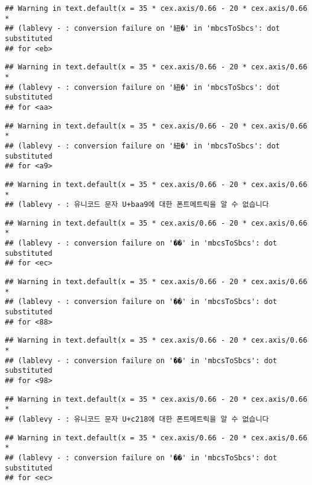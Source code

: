 \documentclass[]{article}
\begin{document}
\begin{verbatim}
## Warning in text.default(x = 35 * cex.axis/0.66 - 20 * cex.axis/0.66 *
## (lablevy - : conversion failure on '紐�' in 'mbcsToSbcs': dot substituted
## for <eb>
\end{verbatim}

\begin{verbatim}
## Warning in text.default(x = 35 * cex.axis/0.66 - 20 * cex.axis/0.66 *
## (lablevy - : conversion failure on '紐�' in 'mbcsToSbcs': dot substituted
## for <aa>
\end{verbatim}

\begin{verbatim}
## Warning in text.default(x = 35 * cex.axis/0.66 - 20 * cex.axis/0.66 *
## (lablevy - : conversion failure on '紐�' in 'mbcsToSbcs': dot substituted
## for <a9>
\end{verbatim}

\begin{verbatim}
## Warning in text.default(x = 35 * cex.axis/0.66 - 20 * cex.axis/0.66 *
## (lablevy - : 유니코드 문자 U+baa9에 대한 폰트메트릭을 알 수 없습니다
\end{verbatim}

\begin{verbatim}
## Warning in text.default(x = 35 * cex.axis/0.66 - 20 * cex.axis/0.66 *
## (lablevy - : conversion failure on '��' in 'mbcsToSbcs': dot substituted
## for <ec>
\end{verbatim}

\begin{verbatim}
## Warning in text.default(x = 35 * cex.axis/0.66 - 20 * cex.axis/0.66 *
## (lablevy - : conversion failure on '��' in 'mbcsToSbcs': dot substituted
## for <88>
\end{verbatim}

\begin{verbatim}
## Warning in text.default(x = 35 * cex.axis/0.66 - 20 * cex.axis/0.66 *
## (lablevy - : conversion failure on '��' in 'mbcsToSbcs': dot substituted
## for <98>
\end{verbatim}

\begin{verbatim}
## Warning in text.default(x = 35 * cex.axis/0.66 - 20 * cex.axis/0.66 *
## (lablevy - : 유니코드 문자 U+c218에 대한 폰트메트릭을 알 수 없습니다
\end{verbatim}

\begin{verbatim}
## Warning in text.default(x = 35 * cex.axis/0.66 - 20 * cex.axis/0.66 *
## (lablevy - : conversion failure on '��' in 'mbcsToSbcs': dot substituted
## for <ec>
\end{verbatim}
\end{document}
